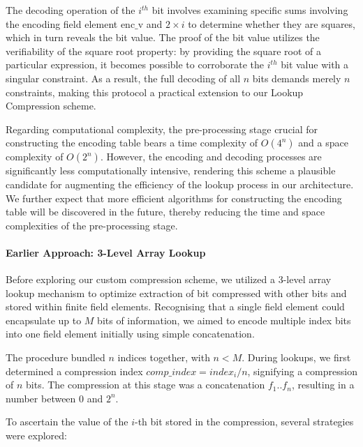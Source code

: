 \documentclass{article}[12pt]
\begin{document}
The decoding operation of the $i^{th}$ bit involves examining specific sums involving the encoding field element $\text{enc\_v}$ and $2 \times i$ to determine whether they are squares, which in turn reveals the bit value.
The proof of the bit value utilizes the verifiability of the square root property: by providing the square root of a particular expression, it becomes possible to corroborate the $i^{th}$ bit value with a singular constraint.
As a result, the full decoding of all $n$ bits demands merely $n$ constraints, making this protocol a practical extension to our Lookup Compression scheme.

Regarding computational complexity, the pre-processing stage crucial for constructing the encoding table bears a time complexity of \(O(4^n)\) and a space complexity of \(O(2^n)\).
However, the encoding and decoding processes are significantly less computationally intensive, rendering this scheme a plausible candidate for augmenting the efficiency of the lookup process in our architecture.
We further expect that more efficient algorithms for constructing the encoding table will be discovered in the future, thereby reducing the time and space complexities of the pre-processing stage.

\paragraph{Earlier Approach: 3-Level Array Lookup}
Before exploring our custom compression scheme, we utilized a 3-level array lookup mechanism to optimize extraction of bit compressed with other bits and stored within finite field elements.
Recognising that a single field element could encapsulate up to \( M \) bits of information, we aimed to encode multiple index bits into one field element initially using simple concatenation.

The procedure bundled \( n \) indices together, with \( n < M \).
During lookups, we first determined a compression index \( comp\_index = index_i / n \), signifying a compression of \( n \) bits.
The compression at this stage was a concatenation \( f_1..f_n \), resulting in a number between 0 and \( 2^n \).

To ascertain the value of the \( i \)-th bit stored in the compression, several strategies were explored:
\end{document}
